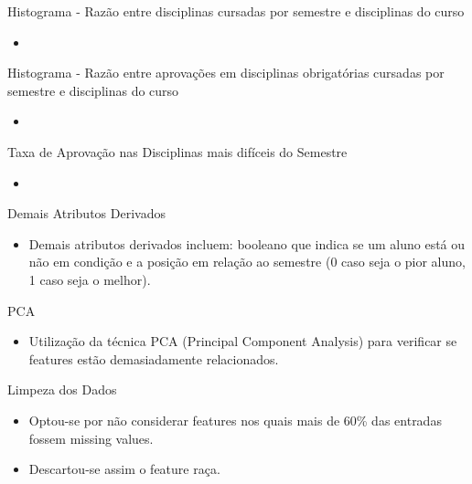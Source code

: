 \begin{frame}{Histograma - Razão entre disciplinas cursadas por semestre e
    disciplinas do curso}
\begin{itemize}[itemsep=3ex]
        \item <Por histograma aqui>
\end{itemize}
\end{frame}

\begin{frame}{Histograma - Razão entre aprovações em disciplinas obrigatórias cursadas 
        por semestre e disciplinas do curso}
\begin{itemize}[itemsep=3ex]
        \item <Por histograma aqui>
\end{itemize}
\end{frame}

\begin{frame}{Taxa de Aprovação nas Disciplinas mais difíceis do Semestre}
\begin{itemize}[itemsep=3ex]
        \item <Por histograma aqui>
\end{itemize}
\end{frame}

\begin{frame}{Demais Atributos Derivados}
\begin{itemize}[itemsep=3ex]
        \item Demais atributos derivados incluem: booleano que indica se um aluno
            está ou não em condição e 
            a posição em relação ao semestre (0 caso seja o pior aluno, 1 caso seja o
            melhor).
\end{itemize}
\end{frame}

\begin{frame}{PCA}
\begin{itemize}[itemsep=3ex]
    \item Utilização da técnica PCA (Principal Component Analysis) para verificar se
        features estão demasiadamente relacionados. 
\end{itemize}
\end{frame}

\begin{frame}{Limpeza dos Dados}
\begin{itemize}[itemsep=3ex]
    \item Optou-se por não considerar features nos quais mais de 60\% das entradas
        fossem missing values.
    \item Descartou-se assim o feature raça.
\end{itemize}
\end{frame}

